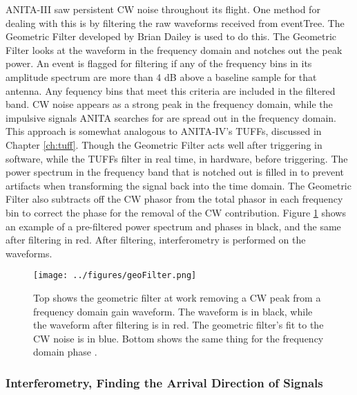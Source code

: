 ANITA-III saw persistent CW noise throughout its flight.  One method for dealing with this is by filtering the raw waveforms received from eventTree.   The Geometric Filter developed by Brian Dailey \cite{brian} is used to do this.  The Geometric Filter looks at the waveform in the frequency domain and notches out the peak power.  An event is flagged for filtering if any of the frequency bins in its amplitude spectrum are more than 4 dB above a baseline sample for that antenna.  Any fequency bins that meet this criteria are included in the filtered band.  CW noise appears as a strong peak in the frequency domain, while the impulsive signals ANITA searches for are spread out in the frequency domain.  This approach is somewhat analogous to ANITA-IV's TUFFs, discussed in Chapter \ref{ch:tuff}.  Though the Geometric Filter acts well after triggering in software, while the TUFFs filter in real time, in hardware, before triggering.  The power spectrum in the frequency band that is notched out is filled in to  prevent artifacts when transforming the signal back into the time domain.  The Geometric Filter also subtracts off the CW phasor from the total phasor in each frequency bin to correct the phase for the removal of the CW contribution.  Figure \ref{fig:geoFilter} shows an example of a pre-filtered power spectrum and phases in black, and the same after filtering in red.  After filtering, interferometry is performed on the waveforms.

\begin{figure}[h]
\centering
\texttt{[image: ../figures/geoFilter.png]}
\caption[Geometric Filter]{Top shows the geometric filter at work removing a CW peak from a frequency domain gain waveform.  The waveform is in black, while the waveform after filtering is in red.  The geometric filter's fit to the CW noise is in blue.  Bottom shows the same thing for the frequency domain phase \cite{brian}.}
\label{fig:geoFilter}
\end{figure}


\subsubsection{Interferometry, Finding the Arrival Direction of Signals}

